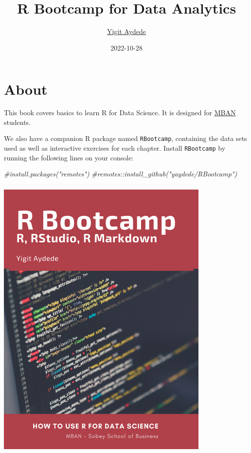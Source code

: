 \documentclass[
]{book}
\title{R Bootcamp for Data Analytics}
\author{\href{https://yaydede.github.io/}{Yigit Aydede}}
\date{2022-10-28}
\newenvironment{Shaded}{\begin{snugshade}}{\end{snugshade}}
\newcommand{\CommentTok}[1]{\textcolor[rgb]{0.56,0.35,0.01}{\textit{#1}}}
\begin{document}
\maketitle

{
\hypersetup{linkcolor=}
\setcounter{tocdepth}{1}
\tableofcontents
}
\hypertarget{about}{%
\chapter*{About}\label{about}}

This book covers basics to learn R for Data Science. It is designed for \href{https://www.smu.ca/mban/index.html}{MBAN} students.

We also have a companion R package named \texttt{RBootcamp}, containing the data sets used as well as interactive exercises for each chapter. Install \texttt{RBootcamp} by running the following lines on your console:

\begin{Shaded}
\begin{Highlighting}[]
\CommentTok{\#install.packages("remotes")}
\CommentTok{\#remotes::install\_github("yaydede/RBootcamp")}
\end{Highlighting}
\end{Shaded}

\includegraphics[width=4.16667in,height=5.72917in]{png/cover2.png}
\end{document}
